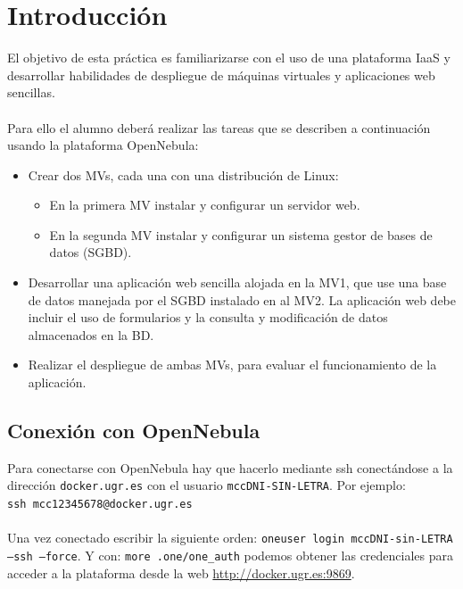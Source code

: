 \newpage %

\tableofcontents %


\newpage


\section{Introducción}

El objetivo de esta práctica es familiarizarse con el uso de una plataforma IaaS y desarrollar habilidades de despliegue de máquinas virtuales y aplicaciones web sencillas.
\\ \\
Para ello el alumno deberá realizar las tareas que se describen a continuación usando la plataforma OpenNebula:

\begin{itemize}
	\item Crear dos MVs, cada una con una distribución de Linux:
	\begin{itemize}
		\item En la primera MV instalar y configurar un servidor web.
		\item En la segunda MV instalar y configurar un sistema gestor de bases de datos (SGBD).
	\end{itemize}
	\item Desarrollar una aplicación web sencilla alojada en la MV1, que use una base de datos manejada por el SGBD instalado en al MV2. La aplicación web debe incluir el uso de formularios y la consulta y modificación de datos almacenados en la BD.
	\item Realizar el despliegue de ambas MVs, para evaluar el funcionamiento de la aplicación.
\end{itemize}

\label{sec:conexion}
\subsection{Conexión con OpenNebula}

Para conectarse con OpenNebula hay que hacerlo mediante ssh conectándose a la dirección \texttt{docker.ugr.es} con el usuario \texttt{mccDNI-SIN-LETRA}. Por ejemplo:
\\
\texttt{ssh mcc12345678@docker.ugr.es}
\\ \\
Una vez conectado escribir la siguiente orden: \texttt{oneuser login mccDNI-sin-LETRA --ssh --force}. Y con: \texttt{more .one/one\_auth} podemos obtener las credenciales para acceder a la plataforma desde la web \url{http://docker.ugr.es:9869}.

